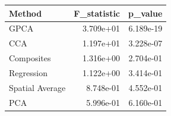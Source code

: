 \begin{tabular}{lrr}
\toprule
Method & F_statistic & p_value \\
\midrule
GPCA & 3.709e+01 & 6.189e-19 \\
CCA & 1.197e+01 & 3.228e-07 \\
Composites & 1.316e+00 & 2.704e-01 \\
Regression & 1.122e+00 & 3.414e-01 \\
Spatial Average & 8.748e-01 & 4.552e-01 \\
PCA & 5.996e-01 & 6.160e-01 \\
\bottomrule
\end{tabular}
